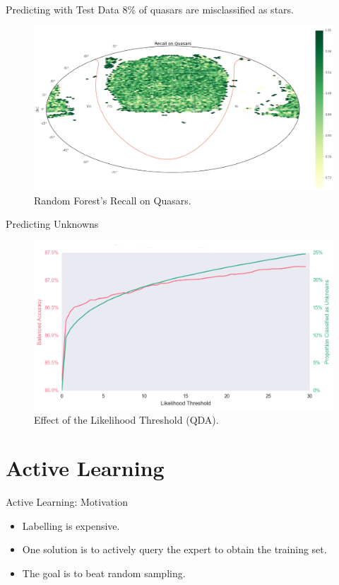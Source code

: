 \documentclass{beamer}
\begin{document}
\begin{frame}{Predicting with Test Data}
	8\% of quasars are misclassified as stars.
	\begin{figure}
		\centering
		\includegraphics[width=\textwidth]{images/recall_quasars}
		\caption{Random Forest's Recall on Quasars.}
	\end{figure}
\end{frame}


\begin{frame}{Predicting Unknowns}
	\begin{figure}
		\centering
		\includegraphics[width=\textwidth]{images/unknowns}
		\caption{Effect of the Likelihood Threshold (QDA).}
	\end{figure}
\end{frame}




\section{Active Learning}
\begin{frame}{Active Learning: Motivation}
	\begin{itemize}
		\item Labelling is expensive.
		\item One solution is to actively query the expert to obtain the training set.
		\item The goal is to beat random sampling.
	\end{itemize}
\end{frame}
\end{document}
